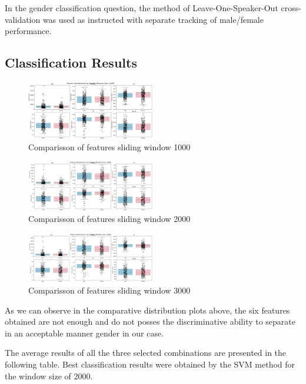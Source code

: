 \documentclass{article}
\begin{document}
In the gender classification question, the method of 
Leave-One-Speaker-Out cross-validation was used as instructed
with separate tracking of male/female performance.

\subsection{Classification Results}
		\begin{figure}[H]
			\centering
			\includegraphics[width=0.5\textwidth]{g1000.png}
			\caption{Comparisson of features sliding window 1000}
			\label{fig4:}
		\end{figure}		

		\begin{figure}[H]
			\centering
			\includegraphics[width=0.5\textwidth]{g2000.png}
			\caption{Comparisson of features sliding window 2000}
			\label{fig4:}
		\end{figure}		

		\begin{figure}[H]
			\centering
			\includegraphics[width=0.5\textwidth]{g3000.png}
			\caption{Comparisson of features sliding window 3000}
			\label{fig4:}
		\end{figure}		

As we can observe in the comparative distribution plots above, the six features obtained
are not enough and do not posses the discriminative ability to separate in an acceptable manner
gender in our case. 


The average results of all the three selected combinations are presented in the following table.
Best classification results were obtained by the SVM method for the window size of 2000.
\end{document}
